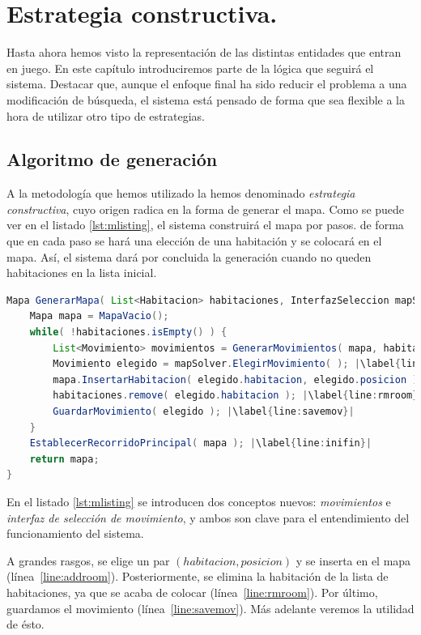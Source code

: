 \chapter{Estrategia constructiva.}\label{cap:capitulo4}

Hasta ahora hemos visto la representación de las distintas entidades que entran en juego. En este capítulo introduciremos parte de la lógica que seguirá el sistema. Destacar que, aunque el enfoque final ha sido reducir el problema a una modificación de búsqueda, el sistema está pensado de forma que sea flexible a la hora de utilizar otro tipo de estrategias.


\section{Algoritmo de generación}
A la metodología que hemos utilizado la hemos denominado \emph{estrategia constructiva}, cuyo origen radica en la forma de generar el mapa. Como se puede ver en el listado \ref{lst:mlisting}, el sistema construirá el mapa por pasos. de forma que en cada paso se hará una elección de una habitación y se colocará en el mapa. Así, el sistema dará por concluida la generación cuando no queden habitaciones en la lista inicial.

\begin{lstlisting}[caption={Algoritmo constructivo para generar mapas},label={lst:mlisting},language=Java,escapechar=|]
Mapa GenerarMapa( List<Habitacion> habitaciones, InterfazSeleccion mapSolver ) {
	Mapa mapa = MapaVacio();
	while( !habitaciones.isEmpty() ) {
		List<Movimiento> movimientos = GenerarMovimientos( mapa, habitaciones ); |\label{line:movgen}|
		Movimiento elegido = mapSolver.ElegirMovimiento( ); |\label{line:ifaceselect}|
		mapa.InsertarHabitacion( elegido.habitacion, elegido.posicion ); |\label{line:addroom}|
		habitaciones.remove( elegido.habitacion ); |\label{line:rmroom}|
		GuardarMovimiento( elegido ); |\label{line:savemov}|
	}
	EstablecerRecorridoPrincipal( mapa ); |\label{line:inifin}|
	return mapa;
}
\end{lstlisting}

En el listado \ref{lst:mlisting} se introducen dos conceptos nuevos: \emph{movimientos} e \emph{interfaz de selección de movimiento}, y ambos son clave para el entendimiento del funcionamiento del sistema.

A grandes rasgos, se elige un par $(habitacion, posicion)$ y se inserta en el mapa (línea~\ref{line:addroom}). Posteriormente, se elimina la habitación de la lista de habitaciones, ya que se acaba de colocar (línea~\ref{line:rmroom}). Por último, guardamos el movimiento (línea~\ref{line:savemov}). Más adelante veremos la utilidad de ésto.

